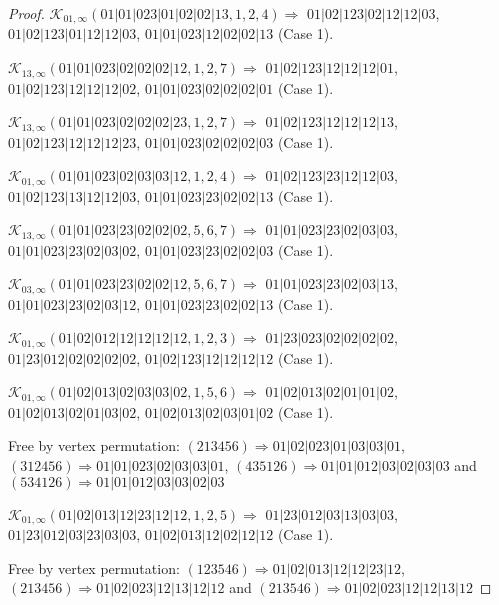 \documentclass[12pt]{article}
\theoremstyle{plain}
\theoremstyle{definition}
\theoremstyle{remark}
\newcommand{\fancy}[1]{\mathcal{#1}}
\def\K{\fancy{K}}
\begin{document}
\begin{proof}
	
	
	\bigskip
	
	$\K_{01,\infty}(01|01|023|01|02|02|13,1, 2, 4)\Rightarrow $ $01|02|123|02|12|12|03$, $01|02|123|01|12|12|03$, $01|01|023|12|02|02|13$ (Case 1).
	
	\bigskip
	
	$\K_{13,\infty}(01|01|023|02|02|02|12,1, 2, 7)\Rightarrow $ $01|02|123|12|12|12|01$, $01|02|123|12|12|12|02$, $01|01|023|02|02|02|01$ (Case 1).
	
	\bigskip
	
	$\K_{13,\infty}(01|01|023|02|02|02|23,1, 2, 7)\Rightarrow $ $01|02|123|12|12|12|13$, $01|02|123|12|12|12|23$, $01|01|023|02|02|02|03$ (Case 1).
	
	\bigskip
	
	$\K_{01,\infty}(01|01|023|02|03|03|12,1, 2, 4)\Rightarrow $ $01|02|123|23|12|12|03$, $01|02|123|13|12|12|03$, $01|01|023|23|02|02|13$ (Case 1).
	
	\bigskip
	
	$\K_{13,\infty}(01|01|023|23|02|02|02,5, 6, 7)\Rightarrow $ $01|01|023|23|02|03|03$, $01|01|023|23|02|03|02$, $01|01|023|23|02|02|03$ (Case 1).
	
	\bigskip
	
	$\K_{03,\infty}(01|01|023|23|02|02|12,5, 6, 7)\Rightarrow $ $01|01|023|23|02|03|13$, $01|01|023|23|02|03|12$, $01|01|023|23|02|02|13$ (Case 1).
	
	\bigskip
	
	$\K_{01,\infty}(01|02|012|12|12|12|12,1, 2, 3)\Rightarrow $ $01|23|023|02|02|02|02$, $01|23|012|02|02|02|02$, $01|02|123|12|12|12|12$ (Case 1).
	
	\bigskip
	
	$\K_{01,\infty}(01|02|013|02|03|03|02,1, 5, 6)\Rightarrow $ $01|02|013|02|01|01|02$, $01|02|013|02|01|03|02$, $01|02|013|02|03|01|02$ (Case 1).
	
	
	
	Free by vertex permutation: $(2 1 3 4 5 6)\Rightarrow 01|02|023|01|03|03|01$, $(3 1 2 4 5 6)\Rightarrow 01|01|023|02|03|03|01$, $(4 3 5 1 2 6)\Rightarrow 01|01|012|03|02|03|03$ and $(5 3 4 1 2 6)\Rightarrow 01|01|012|03|03|02|03$
	
	
	\bigskip
	
	$\K_{01,\infty}(01|02|013|12|23|12|12,1, 2, 5)\Rightarrow $ $01|23|012|03|13|03|03$, $01|23|012|03|23|03|03$, $01|02|013|12|02|12|12$ (Case 1).
	
	
	
	Free by vertex permutation: $(1 2 3 5 4 6)\Rightarrow 01|02|013|12|12|23|12$, $(2 1 3 4 5 6)\Rightarrow 01|02|023|12|13|12|12$ and $(2 1 3 5 4 6)\Rightarrow 01|02|023|12|12|13|12$
	

\end{proof}
\end{document}
